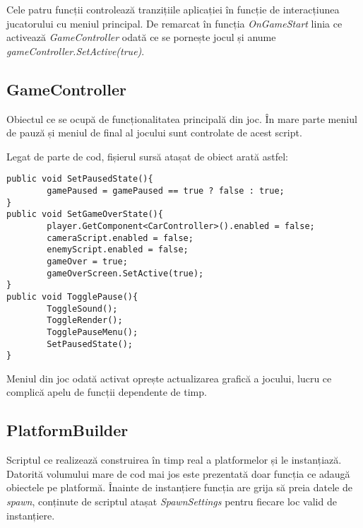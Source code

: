 Cele patru funcții controlează tranzițiile aplicației în funcție de interacțiunea jucatorului cu meniul principal. De remarcat în funcția \textit{OnGameStart} linia ce activează \textit{GameController} odată ce se pornește jocul și anume \textit{gameController.SetActive(true)}.\par

\subsection{GameController}

Obiectul ce se ocupă de funcționalitatea principală din joc. În mare parte meniul de pauză și meniul de final al jocului sunt controlate de acest script.\par

Legat de parte de cod, fișierul sursă atașat de obiect arată astfel:\par

\begin{lstlisting}[caption=Funcțiile din GameController,
  label=a_label]
public void SetPausedState(){
        gamePaused = gamePaused == true ? false : true;
}
public void SetGameOverState(){
        player.GetComponent<CarController>().enabled = false;
        cameraScript.enabled = false;
        enemyScript.enabled = false;
        gameOver = true;
        gameOverScreen.SetActive(true);
}
public void TogglePause(){
        ToggleSound();
        ToggleRender();
        TogglePauseMenu();
        SetPausedState();
}
\end{lstlisting}

Meniul din joc odată activat oprește actualizarea grafică a jocului, lucru ce complică apelu de funcții dependente de timp.\par

\subsection{PlatformBuilder}

Scriptul ce realizează construirea în timp real a platformelor și le instanțiază. Datorită volumului mare de cod mai jos este prezentată doar funcția ce adaugă obiectele pe platformă. Înainte de instanțiere funcția are grija să preia datele de \textit{spawn}, conținute de scriptul atașat \textit{SpawnSettings} pentru fiecare loc valid de instanțiere.\par

